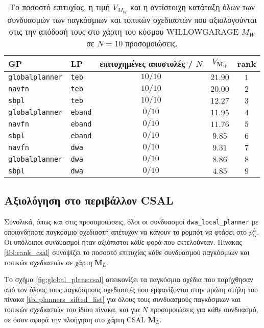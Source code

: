 \begin{table}[htb]\centering
\renewcommand{\arraystretch}{1.3}
\begin{tabular}{llccc}
  GP & LP & επιτυχημένες αποστολές / $N$ & $V_{\bm{M}_W}$ & rank \\ \toprule
  \texttt{globalplanner} & \texttt{teb} & $10/10$ & $21.90$ & $1$ \\
  \texttt{navfn} & \texttt{teb} & $10/10$ & $20.00$ & $2$ \\
  \texttt{sbpl} & \texttt{teb} & $10/10$ & $12.27$ & $3$ \\
  \texttt{globalplanner} & \texttt{eband} & $0/10$ & $11.95$ & $4$ \\
  \texttt{navfn} & \texttt{eband} & $0/10$ & $11.76$ & $5$ \\
  \texttt{sbpl} & \texttt{eband} & $0/10$ & $9.85$ & $6$ \\
  \texttt{navfn} & \texttt{dwa} & $0/10$ & $9.31$ & $7$ \\
  \texttt{globalplanner} & \texttt{dwa} & $0/10$ & $8.86$ & $8$ \\
  \texttt{sbpl} & \texttt{dwa} & $0/10$ & $4.85$ & $9$ \\ \bottomrule
\end{tabular}
\caption{Το ποσοστό επιτυχίας, η τιμή $V_{M_W}$ και η αντίστοιχη κατάταξη όλων των
         συνδυασμών των παγκόσμιων και τοπικών σχεδιαστών που αξιολογούνται στις
         την απόδοσή τους στο χάρτη του κόσμου WILLOWGARAGE $M_W$ σε $N=10$
         προσομοιώσεις.}
\label{tbl:rank_willowgarage}
\end{table}



\subsection{Αξιολόγηση στο περιβάλλον CSAL}
  \label{subsection:02_01_04:04}

Συνολικά, όπως και στις προσομοιώσεις, όλοι οι συνδυασμοί \texttt{dwa\_local\_planner}
με οποιονδήποτε παγκόσμιο σχεδιαστή απέτυχαν να κάνουν το ρομπότ να φτάσει στο $p_G^L$. Οι υπόλοιποι
συνδυασμοί ήταν αξιόπιστοι κάθε φορά που εκτελούνταν. Πίνακας \ref{tbl:rank_csal}
συνοψίζει το ποσοστό επιτυχίας κάθε συνδυασμού παγκόσμιων και τοπικών σχεδιαστών σε
χάρτη $\bm{M}_L$.

Το σχήμα \ref{fig:global_plans:csal} απεικονίζει τα παγκόσμια σχέδια που παρήχθησαν από τον
όλους τους παγκόσμιους σχεδιαστές που εμφανίζονται στην πρώτη στήλη του πίνακα
\ref{tbl:planners_sifted_list} για όλους τους συνδυασμούς παγκόσμιων και τοπικών
σχεδιαστών του ίδιου πίνακα, και για $N$ προσομοιώσεις για κάθε συνδυασμό, σε
όσον αφορά την πλοήγηση στο χάρτη CSAL $\bm{M}_L$.

